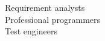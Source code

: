 \documentclass[preview]{standalone}
\begin{document}
Requirement analysts\\Professional programmers\\Test engineers\\
\end{document}
